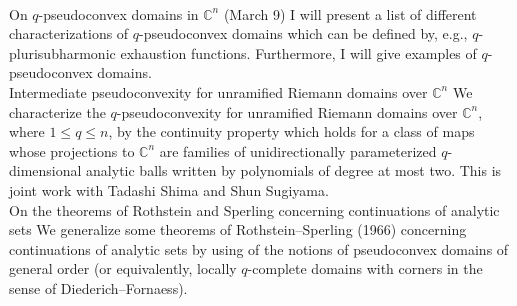 \documentclass[a4]{article}
\theoremstyle{plain} %
\theoremstyle{definition} %
\begin{document}
\vskip5mm
\\
On $q$-pseudoconvex domains in $\mathbb{C}^n$  (March 9)
\vskip3mm
I will present a list of different characterizations of $q$-pseudoconvex domains which can be defined by, e.g., $q$-plurisubharmonic exhaustion functions. Furthermore, I will give examples of $q$-pseudoconvex domains. 
\vskip5mm
\\
Intermediate pseudoconvexity for unramified Riemann domains over $\mathbb{C}^n$
\vskip3mm
We characterize the $q$-pseudoconvexity for unramified Riemann domains over $\mathbb{C}^n$,
where $1 \leq q \leq n$, by the continuity property which holds for a class of maps whose
projections to $\mathbb{C}^n$ are families of unidirectionally parameterized $q$-dimensional
analytic balls written by polynomials of degree at most two. 
This is joint work with Tadashi Shima and Shun Sugiyama.
\vskip5mm
\\
On the theorems of Rothstein and Sperling concerning continuations of analytic sets
\vskip3mm
We generalize some theorems of Rothstein--Sperling (1966) concerning continuations of analytic sets by using of the notions of pseudoconvex domains of general order (or equivalently, locally $q$-complete domains with corners in the sense of Diederich--Fornaess). 
\end{document}
